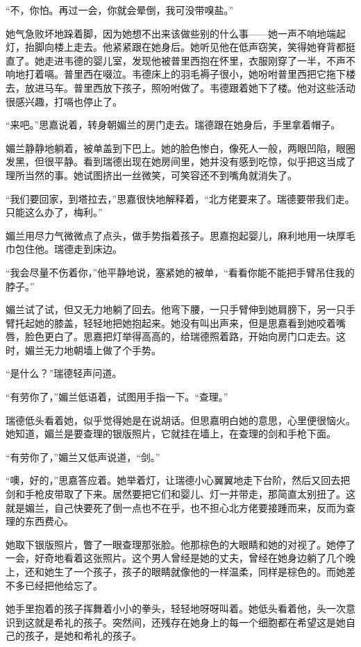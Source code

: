 \par “不，你怕。再过一会，你就会晕倒，我可没带嗅盐。”
\par 她气急败坏地跺着脚，因为她想不出来该做些别的什么事——她一声不响地端起灯，抬脚向楼上走去。他紧紧跟在她身后。她听见他在低声窃笑，笑得她脊背都挺直了。她走进韦德的婴儿室，发现他被普里西抱在怀里，衣服刚穿了一半，不声不响地打着嗝。普里西在啜泣。韦德床上的羽毛褥子很小，她吩咐普里西把它拖下楼去，放进马车。普里西放下孩子，照吩咐做了。韦德跟着她下了楼。他对这些活动很感兴趣，打嗝也停止了。
\par “来吧。”思嘉说着，转身朝媚兰的房门走去。瑞德跟在她身后，手里拿着帽子。
\par 媚兰静静地躺着，被单盖到下巴上。她的脸色惨白，像死人一般，两眼凹陷，眼圈发黑，但很平静。看到瑞德出现在她房间里，她并没有感到吃惊，似乎把这当成了理所当然的事。她试图挤出一丝微笑，可笑容还不到嘴角就消失了。
\par “我们要回家，到塔拉去，”思嘉很快地解释着，“北方佬要来了。瑞德要带我们走。只能这么办了，梅利。”
\par 媚兰用尽力气微微点了点头，做手势指着孩子。思嘉抱起婴儿，麻利地用一块厚毛巾包住他。瑞德走到床边。
\par “我会尽量不伤着你，”他平静地说，塞紧她的被单，“看看你能不能把手臂吊住我的脖子。”
\par 媚兰试了试，但又无力地躺了回去。他弯下腰，一只手臂伸到她肩膀下，另一只手臂托起她的膝盖，轻轻地把她抱起来。她没有叫出声来，但是思嘉看到她咬着嘴唇，脸色更白了。思嘉把灯举得高高的，给瑞德照着路，开始向房门口走去。这时，媚兰无力地朝墙上做了个手势。
\par “是什么？”瑞德轻声问道。
\par “有劳你了，”媚兰低语着，试图用手指一下。“查理。”
\par 瑞德低头看着她，似乎觉得她是在说胡话。但思嘉明白她的意思，心里便很恼火。她知道，媚兰是要查理的银版照片，它就挂在墙上，在查理的剑和手枪下面。
\par “有劳你了，”媚兰又低声说道，“剑。”
\par “噢，好的，”思嘉答应着。她举着灯，让瑞德小心翼翼地走下台阶，然后又回去把剑和手枪皮带取了下来。居然要把它们和婴儿、灯一并带走，那简直太别扭了。这就是媚兰，自己快要死了倒一点也不在乎，也不担心北方佬要接踵而来，反而为查理的东西费心。
\par 她取下银版照片，瞥了一眼查理那张脸。他那棕色的大眼睛和她的对视了。她停了一会，好奇地看着这张照片。这个男人曾经是她的丈夫，曾经在她身边躺了几个晚上，还和她生了一个孩子，孩子的眼睛就像他的一样温柔，同样是棕色的。而她差不多已经把他给忘了。
\par 她手里抱着的孩子挥舞着小小的拳头，轻轻地呀呀叫着。她低头看着他，头一次意识到这就是希礼的孩子。突然间，还残存在她身上的每一个细胞都在希望这是她自己的孩子，是她和希礼的孩子。
